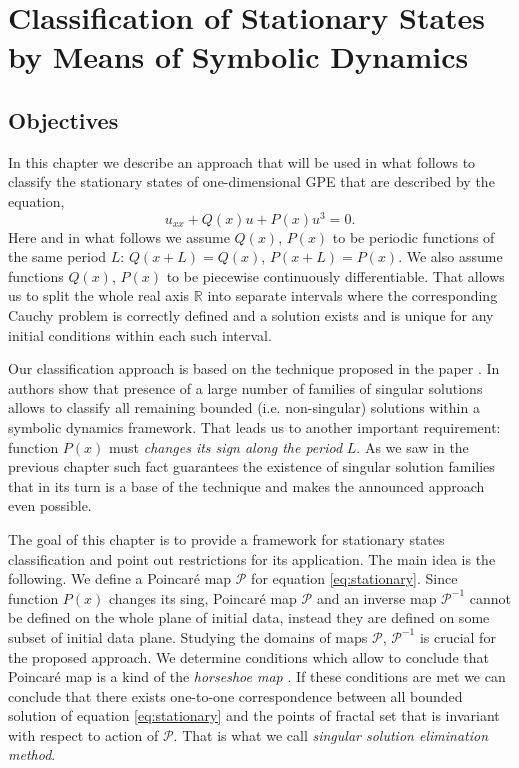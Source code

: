 \chapter{Classification of Stationary States by Means of Symbolic Dynamics}
\label{chapter:II}

\section{Objectives}

In this chapter we describe an approach that will be used in what follows to classify the stationary states of one-dimensional GPE that are described by the equation,
\begin{equation}
	u_{xx} + Q(x) u + P(x) u^3 = 0.
	\label{eq:stationary}
\end{equation}
Here and in what follows we assume $Q(x)$, $P(x)$ to be periodic functions of the same period $L$: $Q(x + L) = Q(x)$, $P(x + L) = P(x)$.
We also assume functions $Q(x)$, $P(x)$ to be piecewise continuously differentiable.
That allows us to split the whole real axis $\mathbb{R}$ into separate intervals where the corresponding Cauchy problem is correctly defined and a solution exists and is unique for any initial conditions within each such interval.

Our classification approach is based on the technique proposed in the paper \cite{AlfimovAvramenko}.
In \cite{AlfimovAvramenko} authors show that presence of a large number of families of singular solutions allows to classify all remaining bounded (i.e. non-singular) solutions within a symbolic dynamics framework.
That leads us to another important requirement: function $P(x)$ must {\it changes its sign along the period} $L$.
As we saw in the previous chapter such fact guarantees the existence of singular solution families that in its turn is a base of the technique and makes the announced approach even possible.

The goal of this chapter is to provide a framework for stationary states classification and point out restrictions for its application.
The main idea is the following.
We define a Poincar\'e map $\mathcal{P}$ for equation \eqref{eq:stationary}.
Since function $P(x)$ changes its sing, Poincar\'e map $\mathcal{P}$ and an inverse map $\mathcal{P}^{-1}$ cannot be defined on the whole plane of initial data, instead they are defined on some subset of initial data plane.
Studying the domains of maps $\mathcal{P}$, $\mathcal{P}^{-1}$ is crucial for the proposed approach.
We determine conditions which allow to conclude that Poincar\'e map is a kind of the {\it horseshoe map} \cite[Chapter 5]{GuekenheimerHolmes}.
If these conditions are met we can conclude that there exists one-to-one correspondence between all bounded solution of equation \eqref{eq:stationary} and the points of fractal set that is invariant with respect to action of $\mathcal{P}$.
That is what we call {\it singular solution elimination method}.

